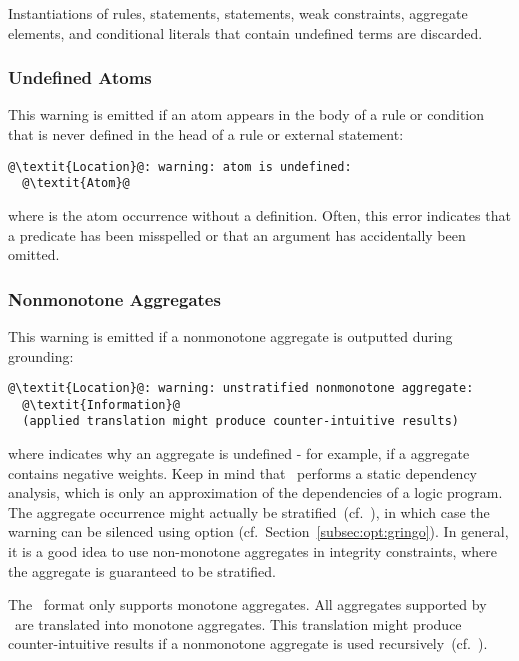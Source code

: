 \begin{note}
Instantiations of rules,  statements,  statements, weak constraints, aggregate elements, and conditional literals
that contain undefined terms are discarded.
\end{note}

\subsubsection{Undefined Atoms}\label{sec:warn:undefatm}
This warning is emitted if an atom appears in the body of a rule or condition
that is never defined in the head of a rule or external statement:
\begin{lstlisting}[numbers=none,escapechar=@]
@\textit{Location}@: warning: atom is undefined:
  @\textit{Atom}@
\end{lstlisting}
%
where  is the atom occurrence without a definition.
Often, this error indicates that a predicate has been misspelled 
or that an argument has accidentally been omitted.

\subsubsection{Nonmonotone Aggregates}\label{sec:warn:nonmon}
This warning is emitted if a nonmonotone aggregate is outputted during grounding:
\begin{lstlisting}[numbers=none,escapechar=@]
@\textit{Location}@: warning: unstratified nonmonotone aggregate:
  @\textit{Information}@
  (applied translation might produce counter-intuitive results)
\end{lstlisting}
where  indicates why an aggregate is undefined
- for example, if a  aggregate contains negative weights.
Keep in mind that \gringo\ performs a static dependency analysis,
which is only an approximation of the dependencies of a logic program.
The aggregate occurrence might actually be stratified~(cf.~\cite{twgng03,aspcore2}),
in which case the warning can be silenced using option  (cf.~Section~\ref{subsec:opt:gringo}).
In general, it is a good idea to use non-monotone aggregates in integrity constraints,
where the aggregate is guaranteed to be stratified.

\begin{note}
The \smodels\ format only supports monotone aggregates.
All aggregates supported by \gringo\ are translated into monotone aggregates.
This translation might produce counter-intuitive results
if a nonmonotone aggregate is used recursively~(cf.~\cite{ferlif05a}).
\end{note}

